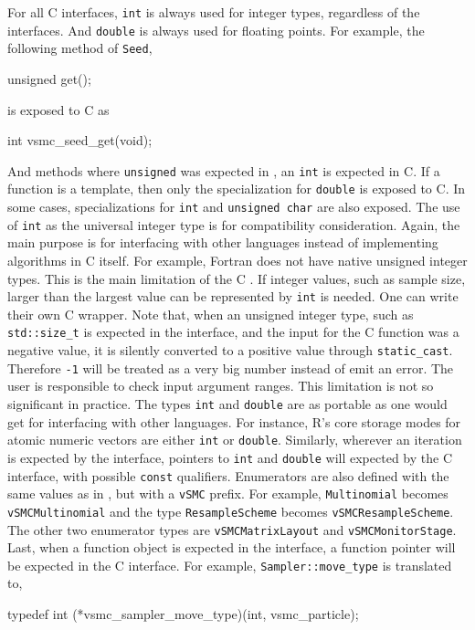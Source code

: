For all C interfaces, \verb|int| is always used for integer types, regardless
of the \cpp interfaces. And \verb|double| is always used for floating points.
For example, the following method of \verb|Seed|,
\begin{cppcode}
  unsigned get();
\end{cppcode}
is exposed to C as
\begin{ccode}
  int vsmc_seed_get(void);
\end{ccode}
And \rng methods where \verb|unsigned| was expected in \cpp, an \verb|int| is
expected in C. If a function is a template, then only the specialization for
\verb|double| is exposed to C. In some cases, specializations for \verb|int|
and \verb|unsigned char| are also exposed. The use of \verb|int| as the
universal integer type is for compatibility consideration. Again, the main
purpose is for interfacing with other languages instead of implementing
algorithms in C itself. For example, Fortran does not have native unsigned
integer types. This is the main limitation of the C \api. If integer values,
such as sample size, larger than the largest value can be represented by
\verb|int| is needed. One can write their own C wrapper. Note that, when an
unsigned integer type, such as \verb|std::size_t| is expected in the \cpp
interface, and the input for the C function was a negative value, it is
silently converted to a positive value through \verb|static_cast|. Therefore
\verb|-1| will be treated as a very big number instead of emit an error. The
user is responsible to check input argument ranges. This limitation is not so
significant in practice. The types \verb|int| and \verb|double| are as portable
as one would get for interfacing with other languages. For instance, R's core
storage modes for atomic numeric vectors are either \verb|int| or
\verb|double|. Similarly, wherever an iteration is expected by the \cpp
interface, pointers to \verb|int| and \verb|double| will expected by the C
interface, with possible \verb|const| qualifiers. Enumerators are also defined
with the same values as in \cpp, but with a \verb|vSMC| prefix. For example,
\verb|Multinomial| becomes \verb|vSMCMultinomial| and the type
\verb|ResampleScheme| becomes \verb|vSMCResampleScheme|. The other two
enumerator types are \verb|vSMCMatrixLayout| and \verb|vSMCMonitorStage|.
Last, when a function object is expected in the \cpp interface, a function
pointer will be expected in the C interface. For example,
\verb|Sampler::move_type| is translated to,
\begin{ccode}
  typedef int (*vsmc_sampler_move_type)(int, vsmc_particle);
\end{ccode}

